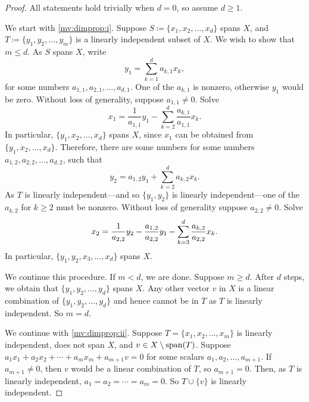 \begin{proof}
All statements hold trivially when $d=0$, so assume $d \geq 1$.

We start with \ref{mv:dimprop:i}.
Suppose $S \coloneqq \{ x_1 , x_2, \ldots, x_d \}$ spans $X$, and
$T \coloneqq \{ y_1, y_2, \ldots, y_m \}$ is a linearly independent
subset of $X$.  We wish to show that $m \leq d$.
As $S$ spans $X$,
write
\begin{equation*}
y_1 = \sum_{k=1}^d a_{k,1} x_k ,
\end{equation*}
for some numbers $a_{1,1},a_{2,1},\ldots,a_{d,1}$.
One of the
$a_{k,1}$ is nonzero, otherwise $y_1$ would be zero.
Without loss of generality, suppose $a_{1,1} \not= 0$.  Solve
\begin{equation*}
x_1 = \frac{1}{a_{1,1}} y_1 - \sum_{k=2}^d \frac{a_{k,1}}{a_{1,1}} x_k .
\end{equation*}
In particular, $\{ y_1 , x_2, \ldots, x_d \}$ spans $X$, since $x_1$ can be
obtained from $\{ y_1 , x_2, \ldots, x_d \}$.  Therefore, there are some numbers
for some numbers $a_{1,2},a_{2,2},\ldots,a_{d,2}$, such that
\begin{equation*}
y_2 = a_{1,2} y_1 + \sum_{k=2}^d a_{k,2} x_k .
\end{equation*}
As $T$ is linearly independent---and so $\{ y_1, y_2 \}$ is linearly
independent---one of the $a_{k,2}$
for $k \geq 2$ must be nonzero.  Without loss of generality suppose 
$a_{2,2} \not= 0$.  Solve
\begin{equation*}
x_2 = \frac{1}{a_{2,2}} y_2 - \frac{a_{1,2}}{a_{2,2}} y_1 - \sum_{k=3}^d
\frac{a_{k,2}}{a_{2,2}} x_k .
\avoidbreak
\end{equation*}
In particular,
$\{ y_1 , y_2, x_3, \ldots, x_d \}$ spans $X$.

We continue this procedure.  If $m < d$, we are done.  Suppose
$m \geq d$.
After $d$ steps, we obtain that 
$\{ y_1 , y_2, \ldots, y_d \}$ spans $X$.  Any
other vector $v$ in $X$ is a linear combination of
$\{ y_1 , y_2, \ldots, y_d \}$ and hence cannot be in $T$ as $T$ is
linearly independent.  So $m = d$.

We continue with \ref{mv:dimprop:ii}.
Suppose 
$T = \{x_1,x_2,\ldots,x_m\}$ is linearly independent,
does not span $X$, and $v \in X \setminus \operatorname{span} (T)$.
Suppose 
$a_1 x_1 + a_2 x_2 + \cdots + a_m x_m + a_{m+1} v = 0$
for some scalars $a_1,a_2,\ldots,a_{m+1}$.
If $a_{m+1} \not=0$, then $v$ would be a linear combination of $T$,
so $a_{m+1} = 0$.  Then, as $T$ is linearly independent, $a_1=a_2=\cdots=a_m = 0$.
So $T \cup \{ v \}$ is linearly independent.


\end{proof}
